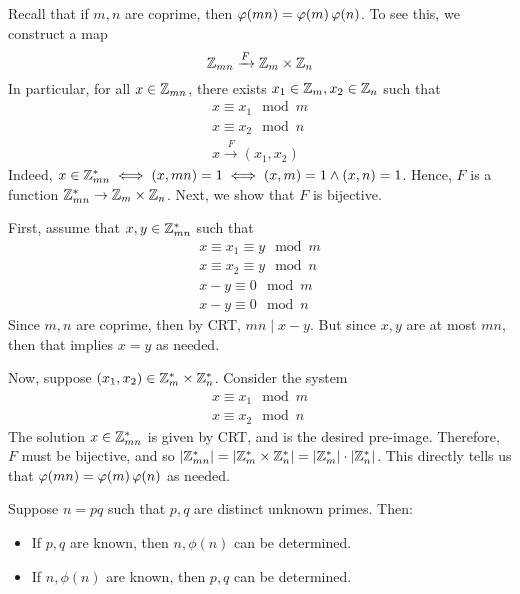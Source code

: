 \documentclass{article}
\begin{document}
\newpage
Recall that if $ m, n $ are coprime, then $ \operatorname{\varphi}(mn) = \operatorname{\varphi}(m)\operatorname{\varphi}(n) $.
To see this, we construct a map
\begin{equation*}
    \mathbb{Z}_{mn} \xrightarrow{F} \mathbb{Z}_{m} \times \mathbb{Z}_{n}
\end{equation*}
In particular, for all $ x \in \mathbb{Z}_{mn} $, there exists $ x_{1} \in \mathbb{Z}_{m}, x_{2} \in \mathbb{Z}_{n} $ such that
\begin{gather*}
    x \equiv x_{1} \mod m \\
    x \equiv x_{2} \mod n \\
    x \xrightarrow{F} (x_{1}, x_{2})
\end{gather*}
Indeed, $ x \in \mathbb{Z}_{mn}^{*} \iff (x, mn) = 1 \iff (x, m) = 1 \wedge (x, n) = 1 $.
Hence, $ F $ is a function $ \mathbb{Z}_{mn}^{*} \rightarrow \mathbb{Z}_{m} \times \mathbb{Z}_{n} $.
Next, we show that $ F $ is bijective.

First, assume that $ x, y \in \mathbb{Z}_{mn}^{*} $ such that
\begin{gather*}
    x \equiv x_{1} \equiv y \mod m \\
    x \equiv x_{2} \equiv y \mod n \\
    x - y \equiv 0 \mod m \\
    x - y \equiv 0 \mod n
\end{gather*}
Since $ m, n $ are coprime, then by CRT, $ mn \mid x - y $.
But since $ x, y $ are at most $ mn $, then that implies $ x = y $ as needed.

Now, suppose $ (x_{1}, x_{2}) \in \mathbb{Z}_{m}^{*} \times \mathbb{Z}_{n}^{*} $.
Consider the system
\begin{gather*}
    x \equiv x_{1} \mod m \\
    x \equiv x_{2} \mod n
\end{gather*}
The solution $ x \in \mathbb{Z}_{mn}^{*} $ is given by CRT, and is the desired pre-image.
Therefore, $ F $ must be bijective, and so $ \abs{\mathbb{Z}_{mn}^{*}} = \abs{\mathbb{Z}_{m}^{*} \times \mathbb{Z}_{n}^{*}} = \abs{\mathbb{Z}_{m}^{*}} \cdot \abs{\mathbb{Z}_{n}^{*}} $.
This directly tells us that $ \operatorname{\varphi}(mn) = \operatorname{\varphi}(m)\operatorname{\varphi}(n) $ as needed.

\begin{lm}
    Suppose $ n = pq $ such that $ p, q $ are distinct unknown primes. Then:
    \begin{itemize}
        \item If $ p, q $ are known, then $ n, \phi(n) $ can be determined.
        \item If $ n, \phi(n) $ are known, then $ p, q $ can be determined.
    \end{itemize}
\end{lm}
\end{document}
